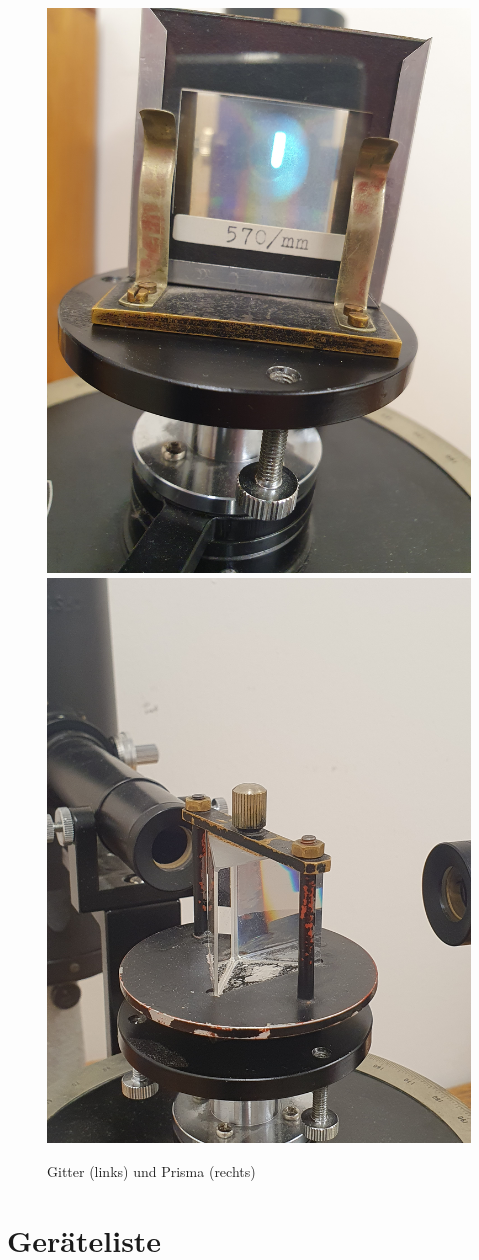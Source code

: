 \documentclass[12pt,a4paper,twoside]{article}
\begin{document}
\begin{figure}[H]
    \centering
    \includegraphics[width=0.6\linewidth, angle=-90]{nudes/gitter.jpg}
    \includegraphics[width=0.6\linewidth, angle=-90]{nudes/prisma.jpg}
    \caption{Gitter (links) und Prisma (rechts)}
    \label{fig:gitterundprisma}
\end{figure}    


\section{Geräteliste} %
\end{document}
